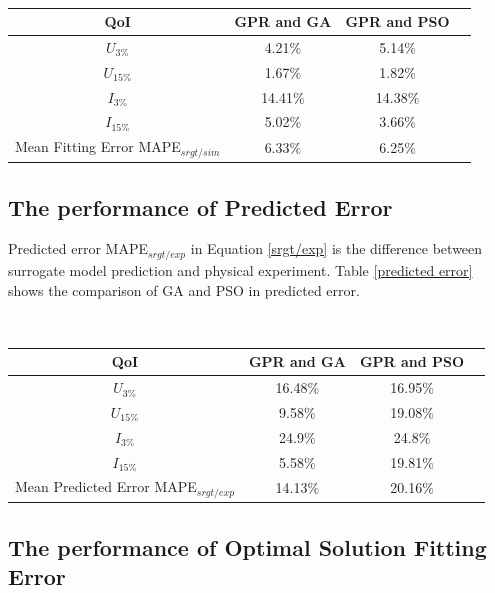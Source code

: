 \begin{minipage}{\linewidth}
	\centering
	\renewcommand\arraystretch{0.95}
	~\\
	\label{fitting error} 
	\begin{tabular}{cccc}
		\hline
		{QoI } &{GPR and GA} &{GPR and PSO}\\
		\hline
		{$U_{3{\%}}$} & 4.21${\%}$ & 5.14${\%}$  \\
		{$U_{15{\%}}$} &1.67${\%}$ & 1.82${\%}$  \\
		{$I_{3{\%}}$} & 14.41${\%}$ & 14.38${\%}$  \\
		{$I_{15{\%}}$} & 5.02${\%}$ & 3.66${\%}$ \\
		\hline
		{Mean Fitting Error MAPE$_{srgt/sim}$} & 6.33${\%}$ & 6.25${\%}$\\ 
		\hline
	\end{tabular}
\end{minipage}
\subsection{The performance of Predicted Error}
Predicted error MAPE$_{srgt/exp}$ in Equation \ref{srgt/exp} is the difference between surrogate model prediction and physical experiment. Table \ref {predicted error} shows the comparison of GA and PSO in predicted error.

\begin{minipage}{\linewidth}
	\centering
	\renewcommand\arraystretch{0.95}
	~\\
	\label{predicted error} 
	\begin{tabular}{cccc}
		\hline
		{QoI } &{GPR and GA} &{GPR and PSO}\\
		\hline
		{$U_{3{\%}}$} & 16.48${\%}$ & 16.95${\%}$  \\
		{$U_{15{\%}}$} &9.58${\%}$ & 19.08${\%}$  \\
		{$I_{3{\%}}$} & 24.9${\%}$ & 24.8${\%}$  \\
		{$I_{15{\%}}$} & 5.58${\%}$ & 19.81${\%}$ \\
		\hline
		{Mean Predicted Error MAPE$_{srgt/exp}$} & 14.13${\%}$ & 20.16${\%}$\\ 
		\hline
	\end{tabular}
\end{minipage}

\subsection{The performance of Optimal Solution Fitting Error}

